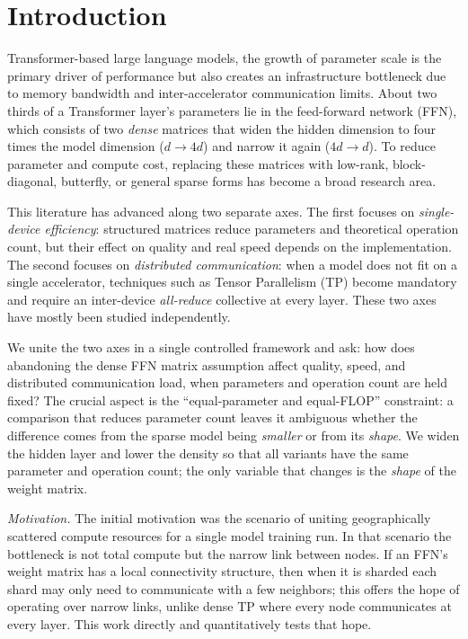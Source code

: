 \documentclass[10pt,journal]{IEEEtran}
\begin{document}
\IEEEpeerreviewmaketitle

\section{Introduction}
 Transformer-based \cite{vaswani2017} large language models, the growth of
parameter scale is the primary driver of performance \cite{kaplan2020,chinchilla2022} but also
creates an infrastructure bottleneck due to memory
bandwidth and inter-accelerator communication limits. About two thirds of a Transformer
layer's parameters lie in the feed-forward network (FFN), which consists of two \emph{dense}
matrices that widen the hidden dimension to four times the model dimension
($d \rightarrow 4d$) and narrow it again ($4d \rightarrow d$). To reduce parameter and compute
cost, replacing these matrices with low-rank, block-diagonal, butterfly, or general sparse
forms has become a broad research area.

This literature has advanced along two separate axes. The first focuses on \emph{single-device
efficiency}: structured matrices reduce parameters and theoretical operation count, but their
effect on quality and real speed depends on the implementation. The second focuses on
\emph{distributed communication}: when a model does not fit on a single accelerator, techniques
such as Tensor Parallelism (TP) become mandatory and require an inter-device \emph{all-reduce}
collective at every layer. These two axes have mostly been studied independently.

We unite the two axes in a single controlled framework and ask: how does abandoning the dense
FFN matrix assumption affect quality, speed, and distributed communication load, when
parameters and operation count are held fixed? The crucial aspect is the ``equal-parameter and
equal-FLOP'' constraint: a comparison that reduces parameter count leaves it ambiguous whether
the difference comes from the sparse model being \emph{smaller} or from its \emph{shape}. We
widen the hidden layer and lower the density so that all variants have the same parameter and
operation count; the only variable that changes is the \emph{shape} of the weight matrix.

\emph{Motivation.} The initial motivation was the scenario of uniting geographically scattered
compute resources for a single model training run. In that scenario the bottleneck is not total
compute but the narrow link between nodes. If an FFN's weight matrix has a local connectivity
structure, then when it is sharded each shard may only need to communicate with a few
neighbors; this offers the hope of operating over narrow links, unlike dense TP where every
node communicates at every layer. This work directly and quantitatively tests that hope.
\end{document}
